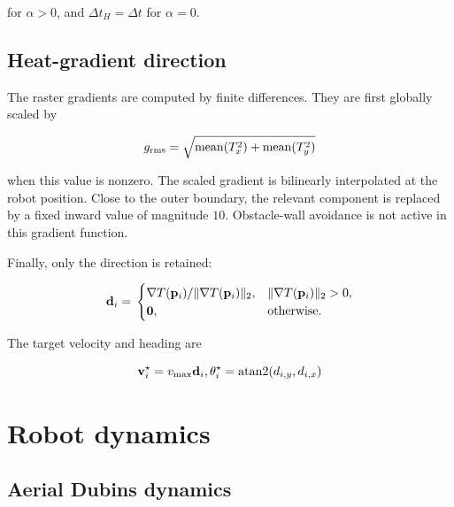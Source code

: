 \documentclass[11pt]{article}
\begin{document}
for $\alpha>0$, and $\Delta t_H=\Delta t$ for $\alpha=0$.


\subsection{Heat-gradient direction}


The raster gradients are computed by finite differences. They are first globally scaled by


\begin{equation}
g_{\mathrm{rms}} \\
= \\
\sqrt{ \\
\mathrm{mean}(T_x^2) \\
+ \\
\mathrm{mean}(T_y^2) \\
}
\end{equation}


when this value is nonzero. The scaled gradient is bilinearly interpolated at the robot position. Close to the outer boundary, the relevant component is replaced by a fixed inward value of magnitude $10$. Obstacle-wall avoidance is not active in this gradient function.


Finally, only the direction is retained:


\begin{equation}
\mathbf d_i \\
= \\
\begin{cases}
\nabla T(\mathbf p_i)/\lVert\nabla T(\mathbf p_i)\rVert_2, &
\lVert\nabla T(\mathbf p_i)\rVert_2>0,\\
\mathbf 0, & \text{otherwise}. \\
\end{cases}
\end{equation}


The target velocity and heading are


\begin{equation}
\mathbf v_i^\star=v_{\max}\mathbf d_i, \\
\qquad \\
\theta_i^\star=\mathrm{atan2}(d_{i,y},d_{i,x})
\end{equation}


\section{Robot dynamics}


\subsection{Aerial Dubins dynamics}
\end{document}
